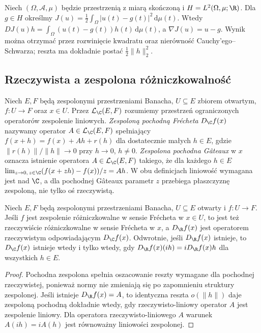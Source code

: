 \begin{przyklad}
\label{ex:integral-functional14}
Niech $(\Omega,\mathcal A,\mu)$ będzie przestrzenią z miarą skończoną i $H=L^2(\Omega,\mu;\R)$. Dla $g\in H$ określmy $J(u)=\frac12\int_\Omega |u(t)-g(t)|^2\,\mathrm d\mu(t)$. Wtedy
$DJ(u)h=\int_\Omega (u(t)-g(t))h(t)\,\mathrm d\mu(t)$,
a $\nabla J(u)=u-g$. Wynik można otrzymać przez rozwinięcie kwadratu oraz nierówność Cauchy'ego--Schwarza; reszta ma dokładnie postać $\frac12\|h\|_2^2$.
\end{przyklad}

\subsection{Rzeczywista a zespolona różniczkowalność}

\begin{definicja}
\label{def:complex-differentiability14}
Niech $E,F$ będą zespolonymi przestrzeniami Banacha, $U\subseteq E$ zbiorem otwartym, $f:U\to F$ oraz $x\in U$. Przez $\mathcal L_{\C}(E,F)$ rozumiemy przestrzeń ograniczonych operatorów zespolenie liniowych. \emph{Zespoloną pochodną Frécheta} $D_{\C}f(x)$ nazywamy operator $A\in\mathcal L_{\C}(E,F)$ spełniający $f(x+h)=f(x)+Ah+r(h)$ dla dostatecznie małych $h\in E$, gdzie $\|r(h)\|/\|h\|\to0$ przy $h\to0$, $h\ne0$. \emph{Zespolona pochodna Gâteaux} w $x$ oznacza istnienie operatora $A\in\mathcal L_{\C}(E,F)$ takiego, że dla każdego $h\in E$
$\lim_{z\to0,\,z\in\C}(f(x+zh)-f(x))/z=Ah$.
W obu definicjach liniowość wymagana jest nad $\C$, a dla pochodnej Gâteaux parametr $z$ przebiega płaszczyznę zespoloną, nie tylko oś rzeczywistą.
\end{definicja}

\begin{stwierdzenie}
\label{prop:complex-real14}
Niech $E,F$ będą zespolonymi przestrzeniami Banacha, $U\subseteq E$ otwarty i $f:U\to F$. Jeśli $f$ jest zespolenie różniczkowalne w sensie Frécheta w $x\in U$, to jest też rzeczywiście różniczkowalne w sensie Frécheta w $x$, a $D_{\R}f(x)$ jest operatorem rzeczywistym odpowiadającym $D_{\C}f(x)$. Odwrotnie, jeśli $D_{\R}f(x)$ istnieje, to $D_{\C}f(x)$ istnieje wtedy i tylko wtedy, gdy $D_{\R}f(x)(ih)=iD_{\R}f(x)h$ dla wszystkich $h\in E$.
\end{stwierdzenie}
\begin{proof}
Pochodna zespolona spełnia oszacowanie reszty wymagane dla pochodnej rzeczywistej, ponieważ normy nie zmieniają się po zapomnieniu struktury zespolonej. Jeśli istnieje $D_{\R}f(x)=A$, to identyczna reszta $o(\|h\|)$ daje zespoloną pochodną dokładnie wtedy, gdy rzeczywisto-liniowy operator $A$ jest zespolenie liniowy. Dla operatora rzeczywisto-liniowego $A$ warunek $A(ih)=iA(h)$ jest równoważny liniowości zespolonej.
\end{proof}

